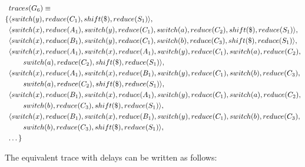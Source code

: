 \documentclass[11pt]{article}
\begin{document}
\parbox{.3\textwidth}{\begin{align*}
&traces(G_6) \equiv \\
\{ & \langle switch(y), reduce(C_1), shift(\$), reduce(S_1) \rangle,\\
   & \langle switch(x), reduce(A_1), switch(y), reduce(C_1), switch(a), reduce(C_2), shift(\$), reduce(S_1) \rangle,\\
   & \langle switch(x), reduce(B_1), switch(y), reduce(C_1), switch(b), reduce(C_3), shift(\$), reduce(S_1) \rangle,\\
   & \langle switch(x), reduce(A_1), switch(x), reduce(A_1), switch(y), reduce(C_1), switch(a), reduce(C_2), \\&\qquad switch(a), reduce(C_2), shift(\$), reduce(S_1) \rangle,\\
   & \langle switch(x), reduce(A_1), switch(x), reduce(B_1), switch(y), reduce(C_1), switch(b), reduce(C_3), \\&\qquad switch(a), reduce(C_2), shift(\$), reduce(S_1) \rangle,\\
   & \langle switch(x), reduce(B_1), switch(x), reduce(A_1), switch(y), reduce(C_1), switch(a), reduce(C_2), \\&\qquad switch(b), reduce(C_3), shift(\$), reduce(S_1) \rangle,\\
   & \langle switch(x), reduce(B_1), switch(x), reduce(B_1), switch(y), reduce(C_1), switch(b), reduce(C_3), \\&\qquad switch(b), reduce(C_3), shift(\$), reduce(S_1) \rangle,\\
   & \textellipsis \}
\end{align*}}

The equivalent trace with delays can be written as follows:
\end{document}
